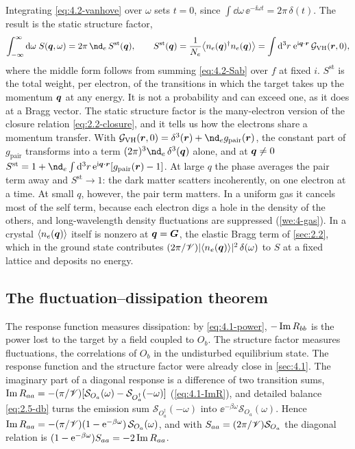 Integrating \cref{eq:4.2-vanhove} over $\omega$ sets $t = 0$, since $\int\dd\omega\,\ee^{-\ii\omega t} = 2\pi\,\delta(t)$. The result is the static structure factor,
\begin{equation}
  \int_{-\infty}^{\infty}\dd\omega\;S(\vect{q},\omega) = 2\pi\,\nd_e\,S^{\mathrm{st}}(\vect{q}), \qquad
  S^{\mathrm{st}}(\vect{q}) = \frac{1}{N_e}\bigl\langle n_e(\vect{q})^\dagger n_e(\vect{q})\bigr\rangle = \int\dd^3r\;\ee^{\ii\vect{q}\cdot\vect{r}}\,\mathcal{G}_{\mathrm{VH}}(\vect{r},0) ,
  \label{eq:4.2-static}
\end{equation}
where the middle form follows from summing \cref{eq:4.2-Sab} over $f$ at fixed $i$. $S^{\mathrm{st}}$ is the total weight, per electron, of the transitions in which the target takes up the momentum $\bm{q}$ at any energy. It is not a probability and can exceed one, as it does at a Bragg vector. The static structure factor is the many-electron version of the closure relation \cref{eq:2.2-closure}, and it tells us how the electrons share a momentum transfer. With $\mathcal{G}_{\mathrm{VH}}(\vect{r},0) = \delta^3(\vect{r}) + \nd_e g_{\mathrm{pair}}(\vect{r})$, the constant part of $g_{\mathrm{pair}}$ transforms into a term $(2\pi)^3\nd_e\,\delta^3(\vect{q})$ alone, and at $\bm{q} \ne 0$ $S^{\mathrm{st}} = 1 + \nd_e\int\dd^3r\,\ee^{\ii\vect{q}\cdot\vect{r}}[g_{\mathrm{pair}}(\vect{r}) - 1]$. At large $q$ the phase averages the pair term away and $S^{\mathrm{st}} \to 1$: the dark matter scatters incoherently, on one electron at a time. At small $q$, however, the pair term matters. In a uniform gas it cancels most of the self term, because each electron digs a hole in the density of the others, and long-wavelength density fluctuations are suppressed (\cref{we:4-gas}). In a crystal $\langle n_e(\bm{q})\rangle$ itself is nonzero at $\bm{q} = \bm{G}$, the elastic Bragg term of \cref{sec:2.2}, which in the ground state contributes $(2\pi/\mathscr{V})|\langle n_e(\bm{q})\rangle|^2\,\delta(\omega)$ to $S$ at a fixed lattice and deposits no energy.

\subsection{The fluctuation--dissipation theorem}

The response function measures dissipation: by \cref{eq:4.1-power}, $-\operatorname{Im} R_{bb}$ is the power lost to the target by a field coupled to $O_b$. The structure factor measures fluctuations, the correlations of $O_b$ in the undisturbed equilibrium state. The response function and the structure factor were already close in \cref{sec:4.1}. The imaginary part of a diagonal response is a difference of two transition sums, $\operatorname{Im} R_{aa} = -(\pi/\mathscr{V})[\mathcal{S}_{O_a}(\omega) - \mathcal{S}_{O_a^\dagger}(-\omega)]$ (\cref{eq:4.1-ImR}), and detailed balance \cref{eq:2.5-db} turns the emission sum $\mathcal{S}_{O_a^\dagger}(-\omega)$ into $\ee^{-\beta\omega}\mathcal{S}_{O_a}(\omega)$. Hence $\operatorname{Im} R_{aa} = -(\pi/\mathscr{V})(1 - \mathrm{e}^{-\beta\omega})\,\mathcal{S}_{O_a}(\omega)$, and with $S_{aa} = (2\pi/\mathscr{V})\mathcal{S}_{O_a}$ the diagonal relation is $(1 - \mathrm{e}^{-\beta\omega})S_{aa} = -2\operatorname{Im} R_{aa}$.

